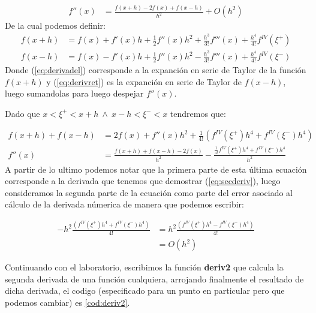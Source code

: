 \documentclass[../portafolio.tex]{subfiles}
\begin{document}
	\begin{align}
	f''(x) &= \frac{f(x+h)-2f(x)+f(x-h)}{h^2} + O(h^2) \label{eq:secderiv}
	\end{align}
De la cual podemos definir:
	\begin{align}
		f(x+h) &= f(x) + f'(x)h + \frac{1}{2}f''(x)h^2 + \frac{h^3}{3!} f'''(x) + \frac{h^4}{4!} f^{IV}(\xi^+) \label{eq:derivadel} \\
		f(x-h) &= f(x) - f'(x)h + \frac{1}{2}f''(x)h^2 - \frac{h^3}{3!} f'''(x) + \frac{h^4}{4!} f^{IV}(\xi^-) \label{eq:derivret}
	\end{align}
Donde (\ref{eq:derivadel}) corresponde a la expanci\'on en serie de Taylor de la funci\'on $f(x+h)$ y (\ref{eq:derivret}) es la expanci\'on en serie de Taylor de $f(x-h)$, luego sumandolas para luego despejar $f''(x)$. 

\medskip
Dado que $x<\xi^+<x+h ~ \wedge ~x-h<\xi^- <x$ tendremos que:

	\begin{align*}
		f(x+h) + f(x-h) &= 2f(x) + f''(x)h^2 + \frac{1}{4!} \left(f^{IV}(\xi^+)h^4 + f^{IV}(\xi^-)h^4 \right) \\
		f''(x) &= \frac{f(x+h)+f(x-h)-2f(x)}{h^2} - \frac{\frac{1}{4!}f^{IV}(\xi^+) h^4+f^{IV}(\xi^-)h^4}{h^2} 
	\end{align*}
A partir de lo ultimo podemos notar que la primera parte de esta \'ultima ecuaci\'on corresponde a la derivada que tenemos que demostrar (\ref{eq:secderiv}), luego consideramos la segunda parte de la ecuaci\'on como parte del error asociado al c\'alculo de la derivada n\'umerica de manera que podemos escribir:

	\begin{align*}
		-h^2 \frac{\left( f^{IV}(\xi^+) h^4+f^{IV}(\xi^-)h^4 \right) }{4!} &= h^2 \frac{\left( f^{IV}(\xi^+) h^4 - f^{IV}(\xi^-)h^4 \right) }{4!} \\
		 &= O(h^2)
	\end{align*}

Continuando con el laboratorio, escribimos la funci\'on \textbf{deriv2} que calcula la segunda derivada de una funci\'on cualquiera, arrojando finalmente el resultado de dicha derivada, el codigo (especificado para un punto en particular pero que podemos cambiar) es \ref{cod:deriv2}.
\end{document}
